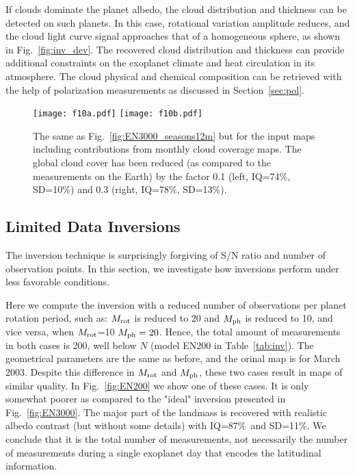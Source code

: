 \documentclass{emulateapj}
\begin{document}
If clouds dominate the planet albedo, 
the cloud distribution and thickness can be detected on such planets. In this case,
rotational variation amplitude reduces, and  
the cloud light curve signal approaches that of a homogeneous sphere, as shown in
Fig.~\ref{fig:inv_dev}. 
The recovered cloud distribution and thickness can provide additional constraints 
on the exoplanet climate and heat circulation in its atmosphere.
The cloud physical and chemical composition can be retrieved with the help of polarization
measurements as discussed in Section~\ref{sec:pol}.

\begin{figure*}
\centering
\texttt{[image: f10a.pdf]}
\texttt{[image: f10b.pdf]}
\caption{The same as Fig.~\ref{fig:EN3000_seasons12m} but for the input maps including contributions from 
monthly cloud coverage maps. The global cloud cover has been reduced (as compared to the measurements 
on the Earth) by the factor 0.1 (left, IQ=74\%, SD=10\%) and 0.3 (right, IQ=78\%, SD=13\%).  
}
\label{fig:EN3000_clouds_m1-12}
\end{figure*}

\subsection{Limited Data Inversions}\label{sec:lim}

The inversion technique is surprisingly forgiving of S/N ratio and number of observation points.
In this section, we investigate how inversions perform under
less favorable conditions.

Here we compute the inversion with a reduced number of observations per planet rotation period, such as: 
$M_{\rm rot}$ is reduced to 20 and 
$M_{\rm ph}$ is reduced to 10, and vice versa, when 
$M_{\rm rot}$=10
$M_{\rm ph}=20$.
Hence, the total amount of measurements in both cases is 200, well below $N$
(model EN200 in Table~\ref{tab:inv}).
The geometrical parameters are the same as before, and the orinal map
is for March 2003.
Despite this difference in $M_{\rm rot}$ and $M_{\rm ph}$, 
these two cases result in maps of similar quality.
In Fig.~\ref{fig:EN200} we show one of these cases.
It is only somewhat poorer as compared to the "ideal" inversion 
presented in Fig.~\ref{fig:EN3000}. The major part of the landmass
is recovered with realistic albedo contrast  (but without some details) 
with IQ=87\%\ and SD=11\%.
We conclude that it is the total number of measurements, not necessarily 
the number of measurements during a single exoplanet day that encodes the
latitudinal information. 
\end{document}
